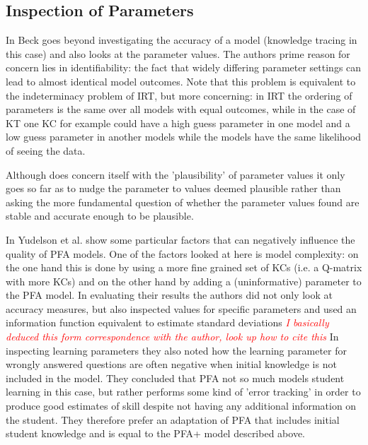 \documentclass{scrartcl}
\newcommand\todo[1]{\textit{\textcolor{red}{#1}}}
\begin{document}
\subsection{Inspection of Parameters}
In \cite{knowledgeproblem} Beck goes beyond investigating the accuracy of a model (knowledge tracing in this case) and also looks at the parameter values. The authors prime reason for concern lies in identifiability: the fact that widely differing parameter settings can lead to almost identical model outcomes. Note that this problem is equivalent to the indeterminacy problem of IRT, but more concerning: in IRT the ordering of parameters is the same over all models with equal outcomes, while in the case of KT one KC for example could have a high guess parameter in one model and a low guess parameter in another models while the models have the same likelihood of seeing the data. 

Although \cite{knowledgeproblem} does concern itself with the 'plausibility' of parameter values it only goes so far as to nudge the parameter to values deemed plausible rather than asking the more fundamental question of whether the parameter values found are stable and accurate enough to be plausible.

In \cite{blackart} Yudelson et al. show some particular factors that can negatively influence the quality of PFA models. One of the factors looked at here is model complexity: on the one hand this is done by using a more fine grained set of KCs (i.e. a Q-matrix with more KCs) and on the other hand by adding a (uninformative) parameter to the PFA model. In evaluating their results the authors did not only look at accuracy measures, but also inspected values for specific parameters and used an information function equivalent to estimate standard deviations \todo{I basically deduced this form correspondence with the author, look up how to cite this} In inspecting learning parameters they also noted how the learning parameter for wrongly answered questions are often negative when initial knowledge is not included in the model. They concluded that PFA not so much models student learning in this case, but rather performs some kind of 'error tracking' in order to produce good estimates of skill despite not having any additional information on the student. They therefore prefer an adaptation of PFA that includes initial student knowledge and is equal to the PFA+ model described above.
\end{document}
